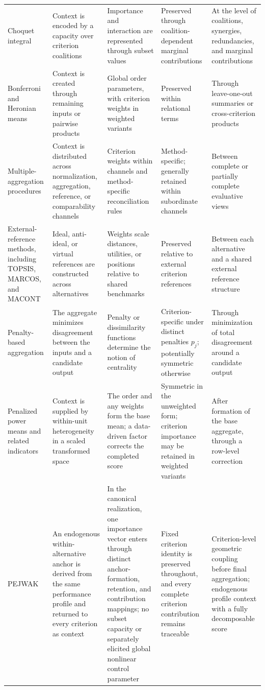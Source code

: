 \documentclass[reqno,11pt]{amsart}
\theoremstyle{definition}
\theoremstyle{plain}
\theoremstyle{remark}
\begin{document}
\begin{landscape}
\begin{center}
\begin{tabularx}{\linewidth}{@{}p{3.3cm}p{4.4cm}p{4.8cm}p{4.0cm}X@{}}
Choquet integral
&
Context is encoded by a capacity over criterion coalitions
&
Importance and interaction are represented through subset values
&
Preserved through coalition-dependent marginal contributions
&
At the level of coalitions, synergies, redundancies, and marginal contributions
\\

Bonferroni and Heronian means
&
Context is created through remaining inputs or pairwise products
&
Global order parameters, with criterion weights in weighted variants
&
Preserved within relational terms
&
Through leave-one-out summaries or cross-criterion products
\\

Multiple-aggregation procedures
&
Context is distributed across normalization, aggregation, reference, or comparability channels
&
Criterion weights within channels and method-specific reconciliation rules
&
Method-specific; generally retained within subordinate channels
&
Between complete or partially complete evaluative views
\\

External-reference methods, including TOPSIS, MARCOS, and MACONT
&
Ideal, anti-ideal, or virtual references are constructed across alternatives
&
Weights scale distances, utilities, or positions relative to shared benchmarks
&
Preserved relative to external criterion references
&
Between each alternative and a shared external reference structure
\\

Penalty-based aggregation
&
The aggregate minimizes disagreement between the inputs and a candidate output
&
Penalty or dissimilarity functions determine the notion of centrality
&
Criterion-specific under distinct penalties $p_j$; potentially symmetric otherwise
&
Through minimization of total disagreement around a candidate output
\\

Penalized power means and related indicators
&
Context is supplied by within-unit heterogeneity in a scaled transformed space
&
The order and any weights form the base mean; a data-driven factor corrects the completed score
&
Symmetric in the unweighted form; criterion importance may be retained in weighted variants
&
After formation of the base aggregate, through a row-level correction
\\

PEJWAK
&
An endogenous within-alternative anchor is derived from the same
performance profile and returned to every criterion as context
&
In the canonical realization, one importance vector enters through
distinct anchor-formation, retention, and contribution mappings; no
subset capacity or separately elicited global nonlinear control parameter
&
Fixed criterion identity is preserved throughout, and every complete
criterion contribution remains traceable
&
Criterion-level geometric coupling before final aggregation; endogenous
profile context with a fully decomposable score
\\


\end{tabularx}
\end{center}
\end{landscape}
\end{document}
